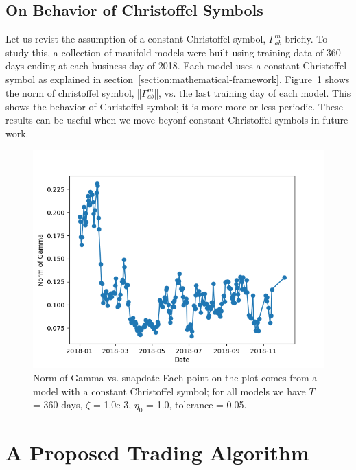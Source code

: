 \documentclass{article}
\begin{document}
\subsection{On Behavior of Christoffel Symbols}\label{subsection:christoffel-behavior}

Let us revist the assumption of a constant Christoffel symbol,
$\Gamma^{m}_{ab}$ briefly. To study this, a collection of manifold
models were built using training data of 360 days ending at each
business day of 2018. Each model uses a constant Christoffel symbol as
explained in
section~\ref{section:mathematical-framework}. Figure~\ref{fig:gamma-time}
shows the norm of christoffel symbol, $\left\Vert \Gamma^{m}_{ab}
\right\Vert$, vs. the last training day of each model. This shows the
behavior of Christoffel symbol; it is more more or less
periodic. These results can be useful when we move beyonf constant
Christoffel symbols in future work.

\begin{figure}\label{fig:gamma-time}
\includegraphics[bb=0 0 640 480]{figures/Gamma_time_2018.png}
\caption{Norm of Gamma vs. snapdate Each point on the plot comes from
  a model with a constant Christoffel symbol; for all models we have
  $T$ = 360 days, $\zeta$ = 1.0e-3, $\eta_{0}$ = 1.0, tolerance =
  0.05.}
\end{figure}

\section{A Proposed Trading Algorithm}\label{section:trading-algorithm}




\end{document}
